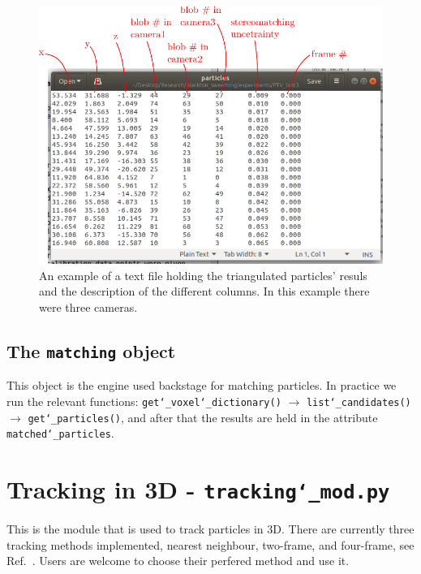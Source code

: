 \documentclass[10pt,a4paper]{article}
\begin{document}
\begin{figure}[h!]
	\centering
	\includegraphics[width=12cm]{particle_file.pdf}
	\caption{An example of a text file holding the triangulated particles' resuls and the description of the different columns. In this example there were three cameras. \label{fig:particlefile}} 
\end{figure}




\subsection{The \texttt{matching} object}

This object is the engine used backstage for matching particles. In practice we run the relevant functions: \texttt{get\char`_voxel\char`_dictionary()} $\rightarrow$ \texttt{list\char`_candidates()} $\rightarrow$ \texttt{get\char`_particles()}, and after that the results are held in the attribute \texttt{matched\char`_particles}.








\section{Tracking in 3D - \texttt{tracking\char`_mod.py}}

This is the module that is used to track particles in 3D. There are currently three tracking methods implemented, nearest neighbour, two-frame, and four-frame, see Ref.~\cite{Ouellette2006}. Users are welcome to choose their perfered method and use it.
\end{document}
